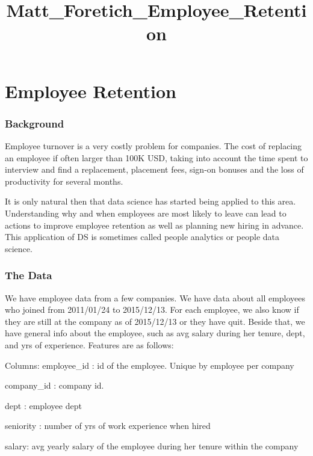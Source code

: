 \documentclass[11pt]{article}
\title{Matt\_Foretich\_Employee\_Retention}
\begin{document}
    
    
    \maketitle
    
    

    
    \section{Employee Retention}\label{employee-retention}

\subsubsection{Background}\label{background}

Employee turnover is a very costly problem for companies. The cost of
replacing an employee if often larger than 100K USD, taking into account
the time spent to interview and find a replacement, placement fees,
sign-on bonuses and the loss of productivity for several months.

It is only natural then that data science has started being applied to
this area. Understanding why and when employees are most likely to leave
can lead to actions to improve employee retention as well as planning
new hiring in advance. This application of DS is sometimes called people
analytics or people data science.

\subsubsection{The Data}\label{the-data}

We have employee data from a few companies. We have data about all
employees who joined from 2011/01/24 to 2015/12/13. For each employee,
we also know if they are still at the company as of 2015/12/13 or they
have quit. Beside that, we have general info about the employee, such as
avg salary during her tenure, dept, and yrs of experience. Features are
as follows:

Columns: employee\_id : id of the employee. Unique by employee per
company

company\_id : company id.

dept : employee dept

seniority : number of yrs of work experience when hired

salary: avg yearly salary of the employee during her tenure within the
company
\end{document}
